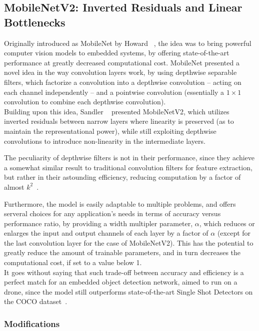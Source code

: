 \subsection{MobileNetV2: Inverted Residuals and Linear Bottlenecks}

Originally introduced as MobileNet by Howard \etal~\cite{MobileNet}, the idea
was to bring powerful computer vision models to embedded systems, by offering
state-of-the-art performance at greatly decreased computational cost. MobileNet
presented a novel idea in the way convolution layers work, by using depthwise
separable filters, which factorize a convolution into a depthwise convolution
-- acting on each channel independently -- and a pointwise convolution
(essentially a $1\times1$ convolution to combine each depthwise convolution).\\

Building upon this idea, Sandler \etal~\cite{MobileNetV2} presented
MobileNetV2, which utilizes inverted residuals between narrow layers where
linearity is preserved (as to maintain the representational power), while still
exploiting depthwise convolutions to introduce non-linearity in the
intermediate layers.

The peculiarity of depthwise filters is not in their performance, since they
achieve a somewhat similar result to traditional convolution filters for
feature extraction, but rather in their astounding efficiency, reducing
computation by a factor of almost $k^2$~\cite{MobileNetV2}.

Furthermore, the model is easily adaptable to multiple problems, and offers
serveral choices for any application's needs in terms of accuracy versus
performance ratio, by providing a width multipler parameter, $\alpha$, which
reduces or enlarges the input and output channels of each layer by a factor of
$\alpha$ (except for the last convolution layer for the case of MobileNetV2).
This has the potential to greatly reduce the amount of trainable parameters,
and in turn decreases the computational cost, if set to a value below 1.\\

It goes without saying that such trade-off between accuracy and efficiency is a
perfect match for an embedded object detection network, aimed to run on a
drone, since the model still outperforms state-of-the-art Single Shot Detectors
on the COCO dataset~\cite{MobileNetV2}.\\

\subsubsection{Modifications}

